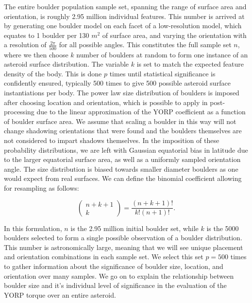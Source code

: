 The entire boulder population sample set, spanning the range of surface area and orientation, is roughly 2.95 million individual features. This number is arrived at by generating one boulder model on each facet of a low-resolution model, which equates to 1 boulder per 130 $m^2$ of surface area, and varying the orientation with a resolution of $\frac{2\pi}{500}$ for all possible angles. This constitutes the full sample set $n$, where we then choose $k$ number of boulders at random to form one instance of an asteroid surface distribution. The variable $k$ is set to match the expected feature density of the body. This is done $p$ times until statistical significance is confidently ensured, typically 500 times to give 500 possible asteroid surface instantiations per body. The power law size distribution of boulders is imposed after choosing location and orientation, which is possible to apply in post-processing due to the linear approximation of the YORP coefficient as a function of boulder surface area. We assume that scaling a boulder in this way will not change shadowing orientations that were found and the boulders themselves are not considered to impart shadows themselves. In the imposition of these probability distributions, we are left with Gaussian equatorial bias in latitude due to the larger equatorial surface area, as well as a uniformly sampled orientation angle. The size distribution is biased towards smaller diameter boulders as one would expect from real surfaces. We can define the binomial coefficient allowing for resampling as follows:

\begin{equation}
    \begin{pmatrix} n+k+1\\ k\end{pmatrix} = \frac{(n+k+1)!}{k!(n+1)!}.
\end{equation}

In this formulation, $n$ is the 2.95 million initial boulder set, while $k$ is the 5000 boulders selected to form a single possible observation of a boulder distribution. This number is astronomically large, meaning that we will see unique placement and orientation combinations in each sample set. We select this set $p = 500$ times to gather information about the significance of boulder size, location, and orientation over many samples. We go on to explain the relationship between boulder size and it's individual level of significance in the evaluation of the YORP torque over an entire asteroid.

